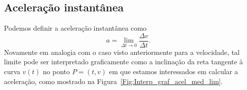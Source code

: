 \subsection{Aceleração instantânea}

Podemos definir a aceleração instantânea como
\begin{equation}
  a = \lim_{\Delta t \to 0} \frac{\Delta v}{\Delta t}.
\end{equation}
%
Novamente em analogia com o caso visto anteriormente para a velocidade, tal limite pode ser interpretado graficamente como a inclinação da reta tangente à curva $v(t)$ no ponto $P = (t,v)$ em que estamos interessados em calcular a aceleração, como mostrado na Figura~\ref{Fig:Interp_graf_acel_med_lim}.

